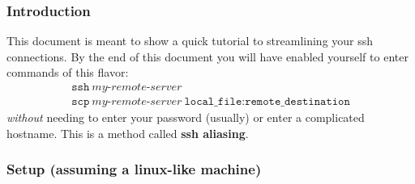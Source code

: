 \documentclass{article}
\begin{document}
\subsubsection*{Introduction}
This document is meant to show a quick tutorial to streamlining your ssh connections.
By the end of this document you will have enabled yourself to enter commands of this flavor:
\begin{gather*}
\mathrm{\texttt{ssh} \ \textit{my-remote-server}} \\
\mathrm{\texttt{scp} \ \textit{my-remote-server} \ \texttt{local\_file}:\texttt{remote\_destination}}
\end{gather*}
\textit{without} needing to enter your password (usually) or enter a complicated hostname. This is a method called \textbf{ssh aliasing}.
\subsubsection*{Setup (assuming a linux-like machine)}
\end{document}
